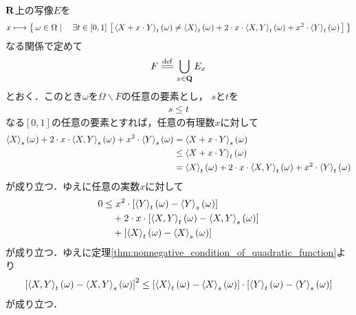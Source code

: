 	\begin{sketch}
		$\mathbf{R}$上の写像$E$を
		\begin{align}
			x \longmapsto \Set{\omega \in \Omega}{\exists t \in [0,1]\, \left[\, 
			\inprod<X+x \cdot Y>_{t}(\omega) \neq
			\inprod<X>_{t}(\omega) + 2 \cdot x \cdot \inprod<X,Y>_{t}(\omega)
			+ x^{2} \cdot \inprod<Y>_{t}(\omega)\, \right]}
		\end{align}
		なる関係で定めて
		\begin{align}
			F \defeq \bigcup_{x \in \Q} E_{x}
		\end{align}
		とおく．このとき$\omega$を$\Omega \backslash F$の任意の要素とし，
		$s$と$t$を
		\begin{align}
			s \leq t
		\end{align}
		なる$[0,1]$の任意の要素とすれば，任意の有理数$x$に対して
		\begin{align}
			\inprod<X>_{s}(\omega) + 2 \cdot x \cdot \inprod<X,Y>_{s}(\omega)
			+ x^{2} \cdot \inprod<Y>_{s}(\omega)
			&= \inprod<X+x \cdot Y>_{s}(\omega) \\
			&\leq \inprod<X+x \cdot Y>_{t}(\omega) \\
			&= \inprod<X>_{t}(\omega) + 2 \cdot x \cdot \inprod<X,Y>_{t}(\omega)
			+ x^{2} \cdot \inprod<Y>_{t}(\omega)
		\end{align}
		が成り立つ．ゆえに任意の実数$x$に対して
		\begin{align}
			0 &\leq x^{2} \cdot \left[\inprod<Y>_{t}(\omega) - \inprod<Y>_{s}(\omega) \right] \\
			&\quad + 2 \cdot x \cdot \left[\inprod<X,Y>_{t}(\omega) - \inprod<X,Y>_{s}(\omega) \right] \\
			&\quad + \left[\inprod<X>_{t}(\omega) - \inprod<X>_{s}(\omega) \right]
		\end{align}
		が成り立つ．ゆえに定理\ref{thm:nonnegative_condition_of_quadratic_function}より
		\begin{align}
			\left[\inprod<X,Y>_{t}(\omega) - \inprod<X,Y>_{s}(\omega)\right]^{2}
			\leq \left[\inprod<X>_{t}(\omega) - \inprod<X>_{s}(\omega)\right] \cdot
			\left[\inprod<Y>_{t}(\omega) - \inprod<Y>_{s}(\omega)\right]
		\end{align}
		が成り立つ．
		\QED
	\end{sketch}
	